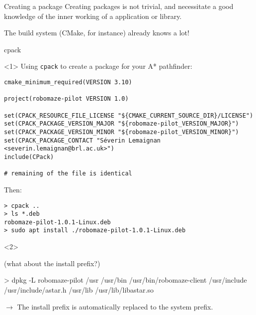 \documentclass[compress]{beamer}
\begin{document}

\begin{frame}{Creating a package}
    Creating packages is not trivial, and necessitate a good knowledge of the
    inner working of a application or library.

    \pause

    The build system (CMake, for instance) already knows a lot!

\end{frame}

\begin{frame}[fragile]{cpack}
\begin{onlyenv}<1>
    Using \texttt{cpack} to create a package for your A* pathfinder:

\begin{verbatim}
cmake_minimum_required(VERSION 3.10)

project(robomaze-pilot VERSION 1.0)

set(CPACK_RESOURCE_FILE_LICENSE "${CMAKE_CURRENT_SOURCE_DIR}/LICENSE")
set(CPACK_PACKAGE_VERSION_MAJOR "${robomaze-pilot_VERSION_MAJOR}")
set(CPACK_PACKAGE_VERSION_MINOR "${robomaze-pilot_VERSION_MINOR}")
set(CPACK_PACKAGE_CONTACT "Séverin Lemaignan <severin.lemaignan@brl.ac.uk>")
include(CPack)

# remaining of the file is identical
\end{verbatim}

Then:

\begin{verbatim}
> cpack ..
> ls *.deb
robomaze-pilot-1.0.1-Linux.deb
> sudo apt install ./robomaze-pilot-1.0.1-Linux.deb
\end{verbatim}
    \end{onlyenv}
    \begin{onlyenv}<2>

        (what about the install prefix?)

\begin{shcode}
> dpkg -L robomaze-pilot
/usr
/usr/bin
/usr/bin/robomaze-client
/usr/include
/usr/include/astar.h
/usr/lib
/usr/lib/libastar.so
\end{shcode}

$\rightarrow$ The install prefix is automatically replaced to the system prefix.
    \end{onlyenv}

\end{frame}
\end{document}
